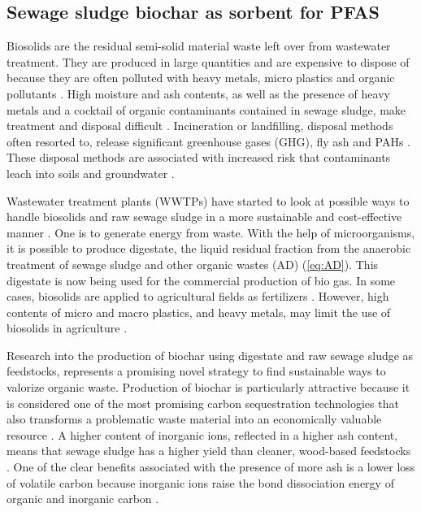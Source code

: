 \subsection{Sewage sludge biochar as sorbent for PFAS}
Biosolids are the residual semi-solid material waste left over from wastewater treatment. They are produced in large quantities and are expensive to dispose of because they are often polluted with heavy metals, micro plastics and organic pollutants \citep{Raheem2018}. High moisture and ash contents, as well as the presence of heavy metals and a cocktail of organic contaminants contained in sewage sludge, make treatment and disposal difficult \citep{Li2019}. Incineration or landfilling, disposal methods often resorted to, release significant greenhouse gases (GHG), fly ash and PAHs \citep{huang2022comparative}. These disposal methods are associated with increased risk that contaminants leach into soils and groundwater \citep{propp2021organic}. 

Wastewater treatment plants (WWTPs) have started to look at possible ways to handle biosolids and raw sewage sludge in a more sustainable and cost-effective manner \citep{Raheem2018}. One is to generate energy from waste. With the help of microorganisms, it is possible to produce digestate, the liquid residual fraction from the anaerobic treatment of sewage sludge and other organic wastes  (AD) (\cref{eq:AD}). This digestate is now being used for the commercial production of bio gas. In some cases, biosolids are applied to agricultural fields as fertilizers \citep{moodie2021legacy}. However, high contents of micro and macro plastics, and heavy metals, may limit the use of biosolids in agriculture \citep{mohajerani2020microplastics}.

Research into the production of biochar using digestate and raw sewage sludge as feedstocks, represents a promising novel strategy to find sustainable ways to valorize organic waste. Production of biochar is particularly attractive because it is considered one of the most promising carbon sequestration technologies that also transforms a problematic waste material into an economically valuable resource \citep{arvaniti2014sorption}. A higher content of inorganic ions, reflected in a higher ash content, means that sewage sludge has a higher yield than cleaner, wood-based feedstocks \citep{Cantrell2012}. One of the clear benefits associated with the presence of more ash is a lower loss of volatile carbon because inorganic ions raise the bond dissociation energy of organic and inorganic carbon \citep{Cantrell2012,Enders2012}. 

